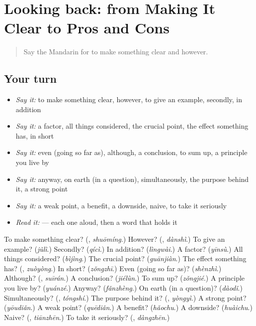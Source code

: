 \section[(dialogue)]{Looking back: from Making It Clear to Pros and Cons}

\label{lesson:ZH-R373-review-369-373}



\begin{quote}
Say the Mandarin for to make something clear and however.
\end{quote}

\subsection*{Your turn}
\begin{itemize}
\raggedright
  \item \emph{Say it:} to make something clear, however, to give an example, secondly, in addition
  \item \emph{Say it:} a factor, all things considered, the crucial point, the effect something has, in short
  \item \emph{Say it:} even (going so far as), although, a conclusion, to sum up, a principle you live by
  \item \emph{Say it:} anyway, on earth (in a question), simultaneously, the purpose behind it, a strong point
  \item \emph{Say it:} a weak point, a benefit, a downside, naive, to take it seriously
  \item \emph{Read it:}   — each one aloud, then a word that holds it
\end{itemize}

\begin{tcolorbox}[breakable,colback=teal!4,colframe=teal!35!black,title={Before you move on}]
To make something clear? (\textbf{}, \emph{shuōmíng}.) However? (\textbf{}, \emph{dànshì}.) To give an example? (\emph{jǔlì}.) Secondly? (\emph{qícì}.) In addition? (\emph{lìngwài}.) A factor? (\emph{yīnsù}.) All things considered? (\emph{bìjìng}.) The crucial point? (\emph{guānjiàn}.) The effect something has? (\textbf{}, \emph{zuòyòng}.) In short? (\emph{zǒngzhī}.) Even (going so far as)? (\emph{shènzhì}.) Although? (\textbf{}, \emph{suīrán}.) A conclusion? (\emph{jiélùn}.) To sum up? (\emph{zǒngjié}.) A principle you live by? (\emph{yuánzé}.) Anyway? (\emph{fǎnzhèng}.) On earth (in a question)? (\emph{dàodǐ}.) Simultaneously? (\textbf{}, \emph{tóngshí}.) The purpose behind it? (\textbf{}, \emph{yòngyì}.) A strong point? (\emph{yōudiǎn}.) A weak point? (\emph{quēdiǎn}.) A benefit? (\emph{hǎochu}.) A downside? (\emph{huàichu}.) Naive? (\textbf{}, \emph{tiānzhēn}.) To take it seriously? (\textbf{}, \emph{dàngzhēn}.)
\end{tcolorbox}
